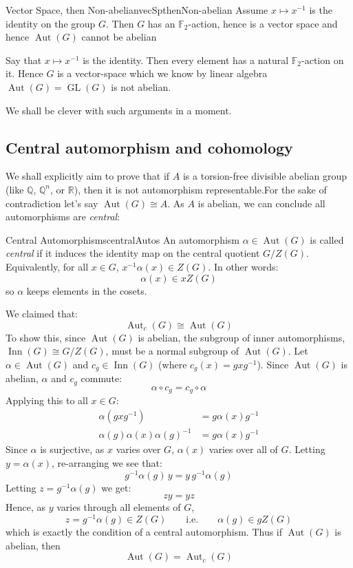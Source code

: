 \documentclass{book}
\newcommand{\F}{{\mathbb{F}}}
\newcommand{\Q}{{\mathbb{Q}}}
\newcommand{\R}{{\mathbb{R}}}
\newcommand{\GL}{{\operatorname{GL}}}
\newcommand{\Aut}{{\operatorname{Aut}}}
\newcommand{\Inn}{{\operatorname{Inn}}}
\newenvironment{Proof}[1][]
  {\begin{ProofTcb}[#1]}
  {\end{ProofTcb}}
\begin{document}
\begin{lem}{Vector Space, then Non-abelian}{vecSpthenNon-abelian}
  Assume $x \mapsto x^{-1}$ is the identity on the group $G$. Then $G$ has an $\F_2$-action, hence is a vector space and hence
  $\Aut(G)$ cannot be abelian
\end{lem}

\begin{Proof}
  Say that $x \mapsto x^{-1}$ is the identity. Then every element has a natural $\F_2$-action on it. Hence $G$
  is a vector-space which we know by linear algebra $\Aut(G) = \GL(G)$ is not abelian.
\end{Proof}

We shall be clever with such arguments in a moment.

\subsection*{Central automorphism and cohomology}

We shall explicitly aim to prove that if $A$ is a torsion-free divisible abelian group (like $\Q$, $\Q^n$, or
$\R$), then it is not automorphism representable.For the sake of contradiction let's say $\Aut(G) \cong A$. As
$A$ is abelian, we can conclude all automorphisms are \emph{central}:

\begin{defn}{Central Automorphisms}{centralAutos}
    An automorphism $\alpha \in \Aut(G)$ is called \emph{central} if it induces the identity map on the
    central quotient $G/Z(G)$. Equivalently, for all $x \in G$, $x^{-1}\alpha(x) \in Z(G)$. In other words:
    \[
      \alpha(x) \in xZ(G)
    \]
    so $\alpha$ keeps elements in the cosets.
\end{defn}

We claimed that:
\[
  \Aut_c(G) \cong \Aut(G)
\]
To show this, since $\Aut(G)$ is abelian, the subgroup of inner automorphisms, $\Inn(G) \cong G/Z(G)$, must be
a normal subgroup of $\Aut(G)$. Let $\alpha \in \Aut(G)$ and $c_g \in \Inn(G)$ (where $c_g(x) = gxg^{-1}$).
Since $\Aut(G)$ is abelian, $\alpha$ and $c_g$ commute:
\[
    \alpha \circ c_g = c_g \circ \alpha
\]
Applying this to all $x \in G$:
\begin{align*}
    \alpha(gxg^{-1}) &= g\alpha(x)g^{-1} \\
    \alpha(g)\alpha(x)\alpha(g)^{-1} &= g\alpha(x)g^{-1}
\end{align*}
Since $\alpha$ is surjective, as $x$ varies over $G$, $\alpha(x)$ varies over all of $G$.  Letting $y
= \alpha(x)$, re-arranging we see that:
\[
  g^{-1} \alpha(g) \, y = y \, g^{-1} \alpha(g)
\]
Letting $z = g^{-1}\alpha(g)$ we get:
\[
  zy = yz
\]
Hence, as $y$ varies through all elements of $G$,
\[
  z = g^{-1}\alpha(g) \in Z(G) \qquad \text{i.e.} \qquad \alpha(g) \in gZ(G)
\]
which is exactly the condition of a central automorphism. Thus if $\Aut(G)$ is abelian, then
\[
  \Aut(G) = \Aut_c(G)
\]
\end{document}
